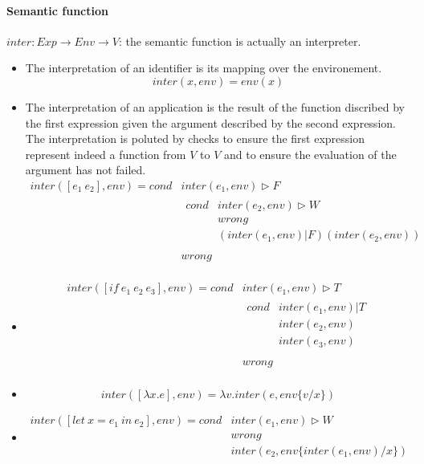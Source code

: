 \documentclass[a4paper]{report}
\begin{document}
\paragraph{Semantic function} $inter : Exp \to Env \to V$: the semantic function is actually an interpreter.

\begin{itemize}
\item The interpretation of an identifier is its mapping over the environement.
$$inter(x,env)=env(x)$$
\item The interpretation of an application is the result of the function discribed by the first expression given the argument described by the second expression. The interpretation is poluted by checks to ensure the first expression represent indeed a function from $V$ to $V$ and to ensure the evaluation of the argument has not failed. 
$$\begin{array}{rl}
inter ([e_1\ e_2],env) = cond & inter(e_1,env)\rhd F\\
& \begin{array}{rl}
	cond & inter(e_2,env) \rhd W\\
	     & wrong\\
	     & (inter(e_1,env) | F)(inter (e_2,env))\\
	\end{array}\\
& wrong\\
\end{array}$$
\item
$$\begin{array}{rl}
inter([if\ e_1\ e_2\ e_3],env) = cond & inter(e_1,env) \rhd T\\
& \begin{array}{rl}
 	cond & inter(e_1,env)|T\\
 	     & inter(e_2,env)\\
 	     & inter(e_3,env)\\
	\end{array}\\
& wrong\\
\end{array}$$
\item $$inter([\lambda x.e],env)=\lambda v.inter(e,env\{v/x\})$$
\item $$\begin{array}{rl}
inter([let\ x=e_1\ in\ e_2],env)=cond & inter(e_1,env)\rhd W\\
& wrong\\
& inter(e_2,env\{inter(e_1,env)/x\})\\
\end{array}$$
\end{itemize}
\end{document}
